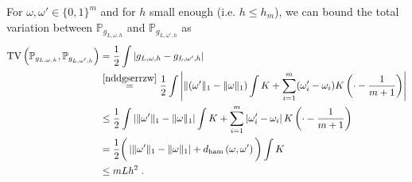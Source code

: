 \documentclass[10pt]{article} %
\newcommand{\Prob}[0]{\mathbb{P}}
\newcommand\tv[2]{\mathrm{TV}\left( {#1}, {#2} \right)}
\newcommand\ham[2]{d_\mathrm{ham}\left( {#1}, {#2} \right)}
\newcommand\p[1]{\left( {#1}\right)}
\begin{document}
For $\omega, \omega' \in \{0, 1\}^m $ and for $h$ small enough (i.e. $h \leq h_m$), we can bound the total variation between $\Prob_{g_{L, \omega, h}}$ and $\Prob_{g_{L, \omega', h}}$ as 
\begin{align}
    \tv{\Prob_{g_{L, \omega, h}}}{\Prob_{g_{L, \omega', h}}} 
    &=
    \frac{1}{2} \int \left| g_{L, \omega, h} - g_{L, \omega', h} \right| \notag\\
    &\stackrel{\eqref{nddgserrzw}}{=}
    \frac{1}{2} \int \left| \| (\omega' \|_1 - \| \omega \|_1) \int K + \sum_{i=1}^m (\omega_i' - \omega_i) K\p{\cdot - \frac{1}{m+1}}\right| \notag\\
    &\leq
    \frac{1}{2} \int \left| \| \omega' \|_1 - \| \omega \|_1\right| \int K + \sum_{i=1}^m \left|\omega_i' - \omega_i\right| K\p{\cdot - \frac{1}{m+1}} \notag \\
    &=
    \frac{1}{2} \bigg( \left| \| \omega' \|_1 - \| \omega \|_1\right|  + \ham{\omega}{\omega'}\bigg) \int K \label{eq:tvsawham}\\
    &\leq mLh^2\;.\label{eq:tvsaw}\
\end{align}
\end{document}
